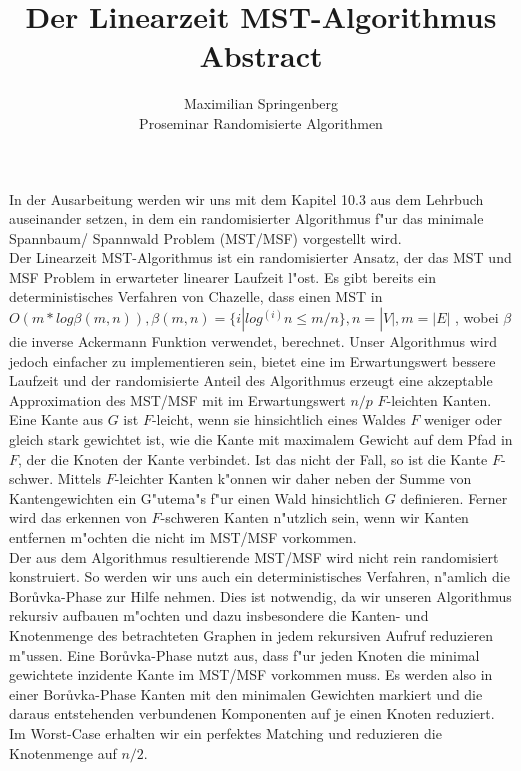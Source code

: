 \documentclass[a4paper,12pt,times,german]{cls/summary}
\title{Der Linearzeit MST-Algorithmus\\
       \LARGE Abstract}
\author{Maximilian Springenberg\\
        \small Proseminar Randomisierte Algorithmen}
\date{}
\begin{document}
\maketitle
In der Ausarbeitung werden wir uns mit dem Kapitel 10.3 aus dem Lehrbuch 
    \cite{randAlg} auseinander
    setzen, in dem ein randomisierter Algorithmus f"ur das minimale Spannbaum/
    Spannwald Problem (MST/MSF) vorgestellt wird.\\
Der Linearzeit MST-Algorithmus ist ein randomisierter Ansatz, der das MST und MSF
    Problem in erwarteter linearer Laufzeit l"ost.
    Es gibt bereits ein deterministisches Verfahren von Chazelle, dass einen MST in
    $O(m * log \beta(m,n)), \beta(m,n) = \{i | log^{(i)} n \leq m / n\}, n = |V|, m = |E|$
    , wobei $\beta$ die inverse Ackermann Funktion verwendet, berechnet.
    Unser Algorithmus wird jedoch einfacher zu implementieren sein, bietet eine
    im Erwartungswert bessere Laufzeit und der randomisierte Anteil des 
    Algorithmus erzeugt eine akzeptable Approximation des MST/MSF mit 
    im Erwartungswert $n/p$ $F$-leichten Kanten.\\
Eine Kante aus $G$ ist $F$-leicht, wenn sie hinsichtlich eines Waldes $F$ 
    weniger oder gleich stark
    gewichtet ist, wie die Kante mit maximalem Gewicht auf dem Pfad in $F$,
    der die Knoten der Kante verbindet. 
    Ist das nicht der Fall, so ist die Kante $F$-schwer.
    Mittels $F$-leichter Kanten k"onnen wir daher neben der Summe von Kantengewichten
    ein G"utema"s f"ur einen Wald hinsichtlich $G$ definieren.
    Ferner wird das erkennen von $F$-schweren Kanten n"utzlich sein, wenn wir
    Kanten entfernen m"ochten die nicht im MST/MSF vorkommen.\\
Der aus dem Algorithmus resultierende MST/MSF wird nicht rein randomisiert 
    konstruiert. 
    So werden wir uns auch ein deterministisches Verfahren, n"amlich die
    Bor\r uvka-Phase zur Hilfe nehmen.
    Dies ist notwendig, da wir unseren Algorithmus rekursiv
    aufbauen m"ochten und dazu insbesondere die Kanten- und Knotenmenge des
    betrachteten Graphen in jedem rekursiven Aufruf reduzieren m"ussen.
    Eine Bor\r uvka-Phase nutzt aus, dass f"ur jeden Knoten die minimal gewichtete
    inzidente Kante im MST/MSF vorkommen muss. 
    Es werden also in einer Bor\r uvka-Phase Kanten mit den minimalen Gewichten
    markiert und die 
    daraus entstehenden verbundenen Komponenten auf je einen Knoten reduziert.
    Im Worst-Case erhalten wir ein perfektes Matching und reduzieren die 
    Knotenmenge auf $n/2$.\\
\end{document}
